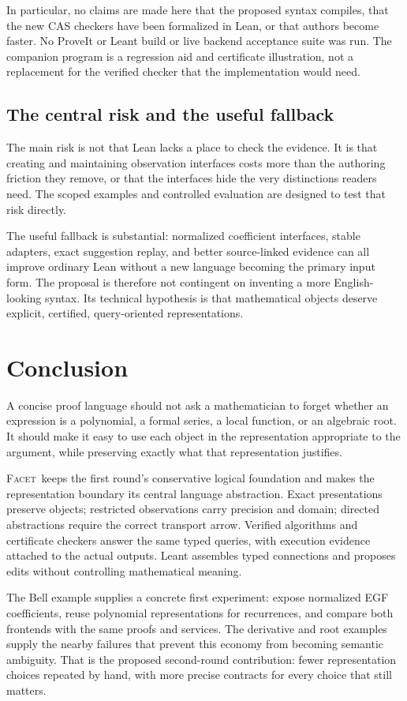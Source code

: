 \documentclass[11pt,a4paper]{article}
\newcommand{\Facet}{\textsc{Facet}}
\theoremstyle{definition}
\begin{document}
In particular, no claims are made here that the proposed syntax compiles, that
the new CAS checkers have been formalized in Lean, or that authors become faster.
No ProveIt or Leant build or live backend acceptance suite was run. The companion
program is a regression aid and certificate illustration, not a replacement for
the verified checker that the implementation would need.

\subsection{The central risk and the useful fallback}
The main risk is not that Lean lacks a place to check the evidence. It is that
creating and maintaining observation interfaces costs more than the authoring
friction they remove, or that the interfaces hide the very distinctions readers
need. The scoped examples and controlled evaluation are designed to test that
risk directly.

The useful fallback is substantial: normalized coefficient interfaces, stable
adapters, exact suggestion replay, and better source-linked evidence can all
improve ordinary Lean without a new language becoming the primary input form.
The proposal is therefore not contingent on inventing a more English-looking
syntax. Its technical hypothesis is that mathematical objects deserve explicit,
certified, query-oriented representations.

\section{Conclusion}
A concise proof language should not ask a mathematician to forget whether an
expression is a polynomial, a formal series, a local function, or an algebraic
root. It should make it easy to use each object in the representation appropriate
to the argument, while preserving exactly what that representation justifies.

\Facet\ keeps the first round's conservative logical foundation and makes the
representation boundary its central language abstraction. Exact presentations
preserve objects; restricted observations carry precision and domain; directed
abstractions require the correct transport arrow. Verified algorithms and
certificate checkers answer the same typed queries, with execution evidence
attached to the actual outputs. Leant assembles typed connections and proposes
edits without controlling mathematical meaning.

The Bell example supplies a concrete first experiment: expose normalized EGF
coefficients, reuse polynomial representations for recurrences, and compare both
frontends with the same proofs and services. The derivative and root examples
supply the nearby failures that prevent this economy from becoming semantic
ambiguity. That is the proposed second-round contribution: fewer representation
choices repeated by hand, with more precise contracts for every choice that
still matters.
\end{document}
